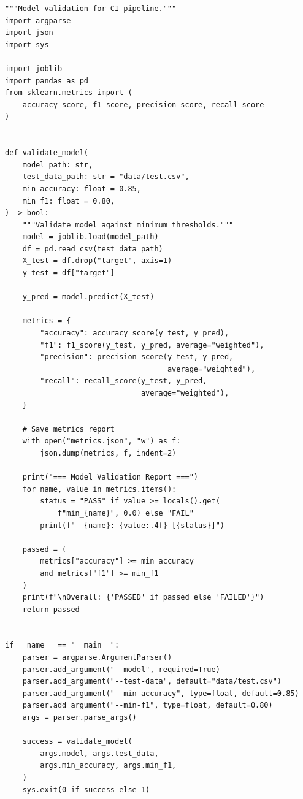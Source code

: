 \begin{codeblock}[title=\textbf{src/evaluate.py --- Model validation script}]
\begin{verbatim}
"""Model validation for CI pipeline."""
import argparse
import json
import sys

import joblib
import pandas as pd
from sklearn.metrics import (
    accuracy_score, f1_score, precision_score, recall_score
)


def validate_model(
    model_path: str,
    test_data_path: str = "data/test.csv",
    min_accuracy: float = 0.85,
    min_f1: float = 0.80,
) -> bool:
    """Validate model against minimum thresholds."""
    model = joblib.load(model_path)
    df = pd.read_csv(test_data_path)
    X_test = df.drop("target", axis=1)
    y_test = df["target"]

    y_pred = model.predict(X_test)

    metrics = {
        "accuracy": accuracy_score(y_test, y_pred),
        "f1": f1_score(y_test, y_pred, average="weighted"),
        "precision": precision_score(y_test, y_pred,
                                     average="weighted"),
        "recall": recall_score(y_test, y_pred,
                               average="weighted"),
    }

    # Save metrics report
    with open("metrics.json", "w") as f:
        json.dump(metrics, f, indent=2)

    print("=== Model Validation Report ===")
    for name, value in metrics.items():
        status = "PASS" if value >= locals().get(
            f"min_{name}", 0.0) else "FAIL"
        print(f"  {name}: {value:.4f} [{status}]")

    passed = (
        metrics["accuracy"] >= min_accuracy
        and metrics["f1"] >= min_f1
    )
    print(f"\nOverall: {'PASSED' if passed else 'FAILED'}")
    return passed


if __name__ == "__main__":
    parser = argparse.ArgumentParser()
    parser.add_argument("--model", required=True)
    parser.add_argument("--test-data", default="data/test.csv")
    parser.add_argument("--min-accuracy", type=float, default=0.85)
    parser.add_argument("--min-f1", type=float, default=0.80)
    args = parser.parse_args()

    success = validate_model(
        args.model, args.test_data,
        args.min_accuracy, args.min_f1,
    )
    sys.exit(0 if success else 1)
\end{verbatim}
\end{codeblock}

